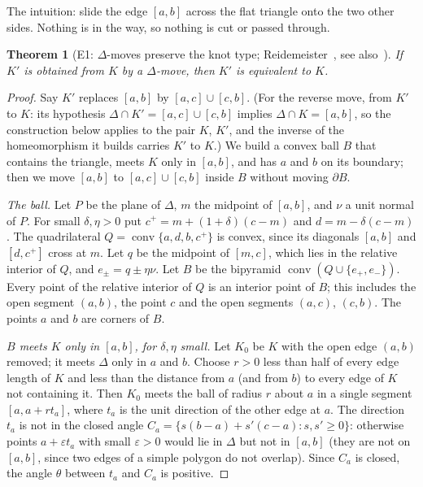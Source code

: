 \documentclass[11pt]{article}
\theoremstyle{plain}
\newtheorem{theorem}{Theorem}[section]
\theoremstyle{definition}
\theoremstyle{remark}
\begin{document}
The intuition: slide the edge $[a,b]$ across the flat triangle onto the two other sides. Nothing is
in the way, so nothing is cut or passed through.

\begin{theorem}[E1: $\Delta$-moves preserve the knot type; Reidemeister~\cite{Rei27}, see also~{\cite[Ch.~1]{BZ}}]\label{thm:deltamove}
If $K'$ is obtained from $K$ by a $\Delta$-move, then $K'$ is equivalent to $K$.
\end{theorem}
\begin{proof}
Say $K'$ replaces $[a,b]$ by $[a,c]\cup[c,b]$. (For the reverse move, from $K'$ to $K$: its hypothesis
$\Delta\cap K'=[a,c]\cup[c,b]$ implies $\Delta\cap K=[a,b]$, so the construction below applies to the pair
$K$, $K'$, and the inverse of the homeomorphism it builds carries $K'$ to $K$.) We
build a convex ball $B$ that contains the triangle, meets $K$ only in $[a,b]$, and has $a$ and $b$ on
its boundary; then we move $[a,b]$ to $[a,c]\cup[c,b]$ inside $B$ without moving $\partial B$.

\emph{The ball.} Let $P$ be the plane of $\Delta$, $m$ the midpoint of $[a,b]$, and $\nu$ a unit normal
of $P$. For small $\delta,\eta>0$ put $c^+=m+(1+\delta)(c-m)$ and $d=m-\delta(c-m)$. The quadrilateral
$Q=\operatorname{conv}\{a,d,b,c^+\}$ is convex, since its diagonals $[a,b]$ and $[d,c^+]$ cross at $m$.
Let $q$ be the midpoint of $[m,c]$, which lies in the relative interior of $Q$, and $e_\pm=q\pm\eta\nu$.
Let $B$ be the bipyramid $\operatorname{conv}(Q\cup\{e_+,e_-\})$. Every point of the relative interior of
$Q$ is an interior point of $B$; this includes the open segment $(a,b)$, the point $c$ and the open
segments $(a,c)$, $(c,b)$. The points $a$ and $b$ are corners of $B$.

\emph{$B$ meets $K$ only in $[a,b]$, for $\delta,\eta$ small.} Let $K_0$ be $K$ with the open edge
$(a,b)$ removed; it meets $\Delta$ only in $a$ and $b$. Choose $r>0$ less than half of every edge length
of $K$ and less than the distance from $a$ (and from $b$) to every edge of $K$ not containing it. Then
$K_0$ meets the ball of radius $r$ about $a$ in a single segment $[a,a+rt_a]$, where $t_a$ is the unit
direction of the other edge at $a$. The direction $t_a$ is not in the closed angle
$C_a=\{s(b-a)+s'(c-a):s,s'\ge0\}$: otherwise points $a+\varepsilon t_a$ with small $\varepsilon>0$ would
lie in $\Delta$ but not in $[a,b]$ (they are not on $[a,b]$, since two edges of a simple polygon do not
overlap). Since $C_a$ is closed, the angle $\theta$ between $t_a$ and $C_a$ is positive.


\end{proof}
\end{document}
